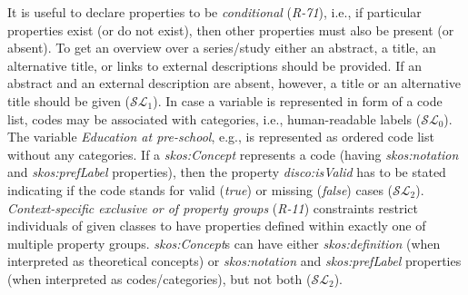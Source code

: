 \documentclass{llncs}
\newenvironment{DL}{
  \small
  \vspace{0cm}
	\begin{center}
  \begin{tabular}{c l}

}{
  \end{tabular}
	\end{center}
}
\begin{document}
{{%
It is useful to declare properties to be \emph{conditional} (\emph{R-71}), i.e., if particular properties exist (or do not exist), then other properties must also be present (or absent).
To get an overview over a series/study either an abstract, a title, an alternative title, or links to external descriptions should be provided. 
If an abstract and an external description are absent, however,  
a title or an alternative title should be given ($\mathcal{SL}_{1}$).
In case a variable is represented in form of a code list, codes may be associated with categories, i.e., human-readable labels ($\mathcal{SL}_{0}$).
The variable \emph{Education at pre-school}, e.g., is represented as ordered code list without any categories.
If a {\em skos:Concept} represents a code (having {\em skos:notation} and {\em skos:prefLabel} properties), 
then the property {\em disco:isValid} has to be stated indicating if the code stands for valid (\emph{true}) or missing (\emph{false}) cases ($\mathcal{SL}_{2}$).
\emph{Context-specific exclusive or of property groups} (\emph{R-11}) constraints
restrict individuals of given classes to have properties defined within exactly one of multiple property groups.
\emph{skos:Concept}s can have either \emph{skos:definition} (when interpreted as theoretical concepts) or \emph{skos:notation} and \emph{skos:prefLabel} properties (when interpreted as codes/categories), but not both ($\mathcal{SL}_{2}$).



%
%

}}
\end{document}
